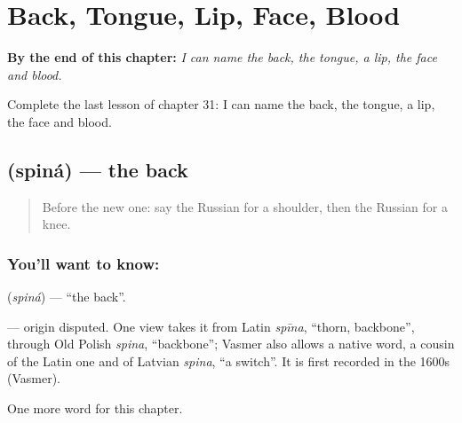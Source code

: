 
\chapter{Back, Tongue, Lip, Face, Blood}
\label{ch:ru-back-tongue-lip-face-blood}

\begin{chapteropening}
\textbf{By the end of this chapter:} \emph{I can name the back, the tongue, a lip, the face and blood.}

Complete the last lesson of chapter 31: I can name the back, the tongue, a lip, the face and blood.
\end{chapteropening}

\section[\texorpdfstring{\ru{спина} (spiná)}{спина (spiná)}]{ (spiná) — the back}

\label{lesson:RU-C31-back}



\begin{quote}
Before the new one: say the Russian for a shoulder, then the Russian for a knee.
\end{quote}

\subsection*{You'll want to know: }
\textbf{} (\emph{spiná}) — \textquotedblleft{}the back\textquotedblright{}.

\begin{cousinweb}
\textbf{} — origin disputed. One view takes it from Latin \emph{spīna}, \textquotedblleft{}thorn, backbone\textquotedblright{}, through Old Polish \emph{spina}, \textquotedblleft{}backbone\textquotedblright{}; Vasmer also allows a native word, a cousin of the Latin one and of Latvian \emph{spina}, \textquotedblleft{}a switch\textquotedblright{}. It is first recorded in the 1600s (Vasmer).
\end{cousinweb}

\begin{grammarlens}[title={What you've built}]
One more word for this chapter.
\end{grammarlens}

